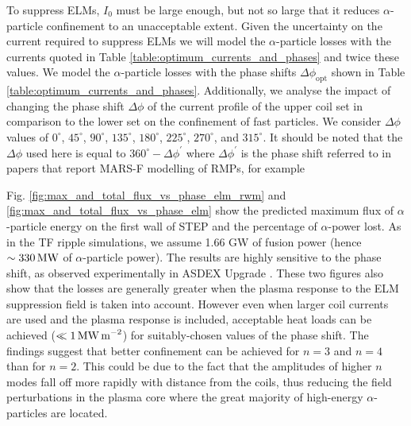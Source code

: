 \documentclass[10pt, a4paper, twoside]{article}
\begin{document}
To suppress ELMs, $I_0$ must be large enough, but not so large that it reduces $\alpha$-particle confinement to an unacceptable extent. Given the uncertainty on the current required to suppress ELMs we will model the $\alpha$-particle losses with the currents quoted in Table \ref{table:optimum_currents_and_phases} and twice these values.
We model the $\alpha$-particle losses with the phase shifts $\Delta\phi_\text{opt}$ shown in Table \ref{table:optimum_currents_and_phases}. Additionally, we analyse the impact of changing the phase shift $\Delta\phi$ of the current profile of the upper coil set in comparison to the lower set on the confinement of fast particles. We consider $\Delta\phi$ values of $0^\circ$, $45^\circ$, $90^\circ$, $135^\circ$, $180^\circ$, $225^\circ$, $270^\circ$, and $315^\circ$. It should be noted that the $\Delta\phi$ used here is equal to $360^{\circ}-\Delta\phi^{\prime}$ where $\Delta\phi^{\prime}$ is the phase shift referred to in papers that report MARS-F modelling of RMPs, for example \cite{ryan2017}   

Fig. \ref{fig:max_and_total_flux_vs_phase_elm_rwm} and \ref{fig:max_and_total_flux_vs_phase_elm} show the predicted maximum flux of $\alpha$-particle energy on the first wall of STEP and the percentage of $\alpha$-power lost. As in the TF ripple simulations, we assume 1.66 GW of fusion power (hence $\sim\text{330\,MW}$ of $\alpha$-particle power). The results are highly sensitive to the phase shift, as observed experimentally in ASDEX Upgrade \cite{sanchis2018}. These two figures also show that the losses are generally greater when the plasma response to the ELM suppression field is taken into account. However even when larger coil currents are used and the plasma response is included, acceptable heat loads can be achieved ($\ll 1\text{\,MW\,m}^{-2}$) for suitably-chosen values of the phase shift. The findings suggest that better confinement can be achieved for $n=3$ and $n=4$ than for $n=2$. This could be due to the fact that the amplitudes of higher $n$ modes fall off more rapidly with distance from the coils, thus reducing the field perturbations in the plasma core where the great majority of high-energy $\alpha$-particles are located.
\end{document}
